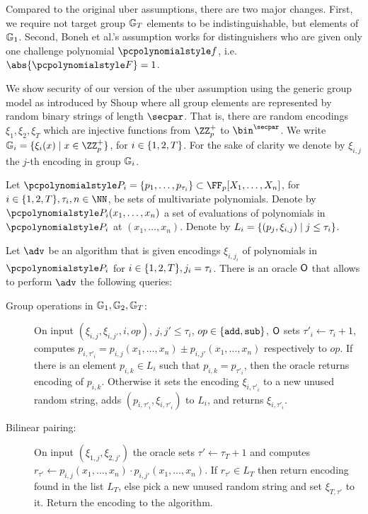 \documentclass[runningheads,11pt]{llncs}
\begin{document}
  Compared to the original uber assumptions, there are two major changes. First,
  we require not target group $\mathbb{G}_T$ elements to be indistinguishable, but
  elements of $\mathbb{G}_1$. Second, Boneh et al.'s assumption works for
  distinguishers who are given only one challenge polynomial $\p{f}$,
  i.e.~$\abs{\p{F}} = 1$.
  
We show security of our version of the uber assumption using the generic group
model as introduced by Shoup \cite{EC:Shoup97} where all group elements are
represented by random binary strings of length $\secpar$. That is, there are
random encodings $\xi_1, \xi_2, \xi_T$ which are injective functions from
$\ZZ_p^+$ to $\bin^{\secpar}$. We write
$\GRP_i = \smallset{\xi_i(x) \mid x \in \ZZ_p^+}$, for
$i \in \{1, 2, T\}$. For the sake of clarity  we denote by $\xi_{i, j}$
the $j$-th encoding in group $\mathbb{G}_i$.

Let
$\p{P}_i = \smallset{p_1, \ldots, p_{\tau_i}} \subset \FF_p[X_1, \ldots, X_n]$,
for $i \in \smallset{1, 2, T}, \tau_i, n \in \NN$, be sets of multivariate
polynomials. Denote by $\p{P}_i(x_1, \ldots, x_n)$ a set of evaluations of
polynomials in $\p{P_i}$ at $(x_1, \ldots, x_n)$. Denote by
$L_i = \{(p_j, \xi_{i, j}) \mid j \leq \tau_i\}$.

Let $\adv$ be an algorithm that is given encodings $\xi_{i, j_i}$ of polynomials
in $\p{P}_i$ for $i \in \{1, 2, T\}, j_i = \tau_i$. There is an oracle $\mathsf{O}$
that allows to perform $\adv$ the following queries:
\begin{description}
\item[Group operations in $\mathbb{G}_1, \mathbb{G}_2, \mathbb{G}_T$:] On input
  $(\xi_{i, j}, \xi_{i, j'}, i, op)$, $j, j' \leq \tau_i$,
  $op \in \{\mathtt{add}, \mathtt{sub}\}$, $\mathsf{O}$ sets $\tau'_i \gets \tau_i + 1$,
  computes
  $p_{i, \tau'_i} = p_{i, j}(x_1, \ldots, x_n) \pm p_{i, j'}(x_1, \ldots, x_n)$
  respectively to $op$. If there is an element  $p_{i, k} \in L_i$ such 
  that $p_{i, k} = p_{\tau'_i}$, then the oracle returns encoding of $p_{i,
    k}$. Otherwise it sets the encoding $\xi_{i, \tau'_i}$ to a new unused
  random string, adds $(p_{i, \tau'_i}, \xi_{i, \tau'_i})$ to $L_i$, and returns
  $\xi_{i, \tau'_i}$.
\item[Bilinear pairing:] On input $(\xi_{1, j}, \xi_{2, j'})$ the oracle sets
  $\tau' \gets \tau_T + 1$ and computes
  $r_{\tau'} \gets p_{i, j}(x_1, \ldots, x_n) \cdot p_{i, j'}(x_1, \ldots,
  x_n)$. If $r_{\tau'} \in L_T$ then return encoding found in the list $L_T$,
  else pick a new unused random string and set $\xi_{T, \tau'}$ to it. Return
  the encoding to the algorithm.
\end{description}
\end{document}
